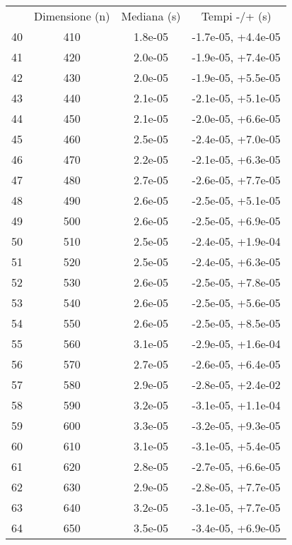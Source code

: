 \begin{table}
\centering
\begin{adjustbox}{width=1\textwidth/2}
\begin{tabular}{|c|c|c|c|}
\hline
 & Dimensione (n) & Mediana (s) & Tempi -/+ (s) \\
40 & 410 & 1.8e-05 & -1.7e-05, +4.4e-05 \\
\cline{1-4}
41 & 420 & 2.0e-05 & -1.9e-05, +7.4e-05 \\
\cline{1-4}
42 & 430 & 2.0e-05 & -1.9e-05, +5.5e-05 \\
\cline{1-4}
43 & 440 & 2.1e-05 & -2.1e-05, +5.1e-05 \\
\cline{1-4}
44 & 450 & 2.1e-05 & -2.0e-05, +6.6e-05 \\
\cline{1-4}
45 & 460 & 2.5e-05 & -2.4e-05, +7.0e-05 \\
\cline{1-4}
46 & 470 & 2.2e-05 & -2.1e-05, +6.3e-05 \\
\cline{1-4}
47 & 480 & 2.7e-05 & -2.6e-05, +7.7e-05 \\
\cline{1-4}
48 & 490 & 2.6e-05 & -2.5e-05, +5.1e-05 \\
\cline{1-4}
49 & 500 & 2.6e-05 & -2.5e-05, +6.9e-05 \\
\cline{1-4}
50 & 510 & 2.5e-05 & -2.4e-05, +1.9e-04 \\
\cline{1-4}
51 & 520 & 2.5e-05 & -2.4e-05, +6.3e-05 \\
\cline{1-4}
52 & 530 & 2.6e-05 & -2.5e-05, +7.8e-05 \\
\cline{1-4}
53 & 540 & 2.6e-05 & -2.5e-05, +5.6e-05 \\
\cline{1-4}
54 & 550 & 2.6e-05 & -2.5e-05, +8.5e-05 \\
\cline{1-4}
55 & 560 & 3.1e-05 & -2.9e-05, +1.6e-04 \\
\cline{1-4}
56 & 570 & 2.7e-05 & -2.6e-05, +6.4e-05 \\
\cline{1-4}
57 & 580 & 2.9e-05 & -2.8e-05, +2.4e-02 \\
\cline{1-4}
58 & 590 & 3.2e-05 & -3.1e-05, +1.1e-04 \\
\cline{1-4}
59 & 600 & 3.3e-05 & -3.2e-05, +9.3e-05 \\
\cline{1-4}
60 & 610 & 3.1e-05 & -3.1e-05, +5.4e-05 \\
\cline{1-4}
61 & 620 & 2.8e-05 & -2.7e-05, +6.6e-05 \\
\cline{1-4}
62 & 630 & 2.9e-05 & -2.8e-05, +7.7e-05 \\
\cline{1-4}
63 & 640 & 3.2e-05 & -3.1e-05, +7.7e-05 \\
\cline{1-4}
64 & 650 & 3.5e-05 & -3.4e-05, +6.9e-05 \\

\end{tabular}
\end{adjustbox}
\end{table}
